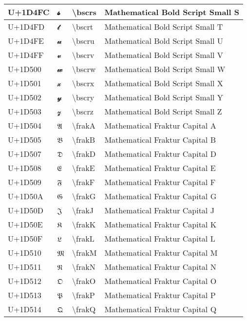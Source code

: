 \begin{table}[h]
\begin{tabulary}{\linewidth}{|L|L|L|L|}
\hline
U+1D4FC & 𝓼 & {\textbackslash}bscrs & Mathematical Bold Script Small S \\
\hline
U+1D4FD & 𝓽 & {\textbackslash}bscrt & Mathematical Bold Script Small T \\
\hline
U+1D4FE & 𝓾 & {\textbackslash}bscru & Mathematical Bold Script Small U \\
\hline
U+1D4FF & 𝓿 & {\textbackslash}bscrv & Mathematical Bold Script Small V \\
\hline
U+1D500 & 𝔀 & {\textbackslash}bscrw & Mathematical Bold Script Small W \\
\hline
U+1D501 & 𝔁 & {\textbackslash}bscrx & Mathematical Bold Script Small X \\
\hline
U+1D502 & 𝔂 & {\textbackslash}bscry & Mathematical Bold Script Small Y \\
\hline
U+1D503 & 𝔃 & {\textbackslash}bscrz & Mathematical Bold Script Small Z \\
\hline
U+1D504 & 𝔄 & {\textbackslash}frakA & Mathematical Fraktur Capital A \\
\hline
U+1D505 & 𝔅 & {\textbackslash}frakB & Mathematical Fraktur Capital B \\
\hline
U+1D507 & 𝔇 & {\textbackslash}frakD & Mathematical Fraktur Capital D \\
\hline
U+1D508 & 𝔈 & {\textbackslash}frakE & Mathematical Fraktur Capital E \\
\hline
U+1D509 & 𝔉 & {\textbackslash}frakF & Mathematical Fraktur Capital F \\
\hline
U+1D50A & 𝔊 & {\textbackslash}frakG & Mathematical Fraktur Capital G \\
\hline
U+1D50D & 𝔍 & {\textbackslash}frakJ & Mathematical Fraktur Capital J \\
\hline
U+1D50E & 𝔎 & {\textbackslash}frakK & Mathematical Fraktur Capital K \\
\hline
U+1D50F & 𝔏 & {\textbackslash}frakL & Mathematical Fraktur Capital L \\
\hline
U+1D510 & 𝔐 & {\textbackslash}frakM & Mathematical Fraktur Capital M \\
\hline
U+1D511 & 𝔑 & {\textbackslash}frakN & Mathematical Fraktur Capital N \\
\hline
U+1D512 & 𝔒 & {\textbackslash}frakO & Mathematical Fraktur Capital O \\
\hline
U+1D513 & 𝔓 & {\textbackslash}frakP & Mathematical Fraktur Capital P \\
\hline
U+1D514 & 𝔔 & {\textbackslash}frakQ & Mathematical Fraktur Capital Q \\

\end{tabulary}
\end{table}
